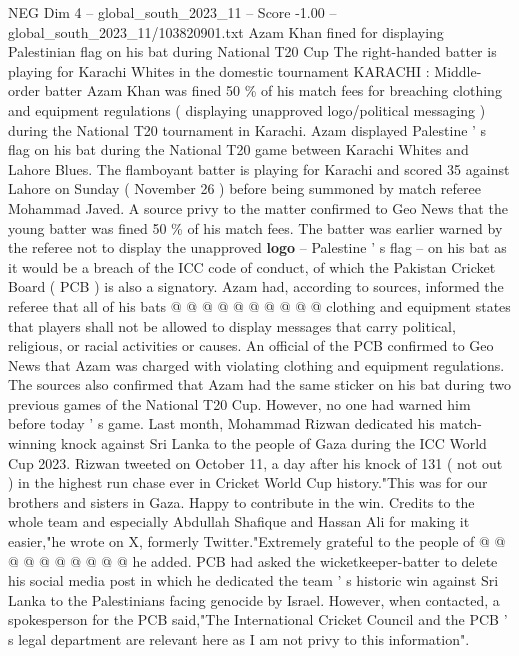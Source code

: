 \begin{textsample}{NEG Dim 4 – global\_south\_2023\_11 – Score -1.00 – global\_south\_2023\_11/103820901.txt}  \label{ex:f4_neg_301}
Azam Khan fined for displaying Palestinian flag on his bat during National T20 Cup The right-handed batter is playing for Karachi Whites in the domestic tournament KARACHI : Middle-order batter Azam Khan was fined 50 \% of his match fees for breaching clothing and equipment regulations ( displaying unapproved logo/political messaging ) during the National T20 tournament in Karachi.
Azam displayed Palestine ' s flag on his bat during the National T20 game between Karachi Whites and Lahore Blues.
The flamboyant batter is playing for Karachi and scored 35 against Lahore on Sunday ( November 26 ) before being summoned by match referee Mohammad Javed.
A source privy to the matter confirmed to Geo News that the young batter was fined 50 \% of his match fees.
The batter was earlier warned by the referee not to display the unapproved \textbf{logo} -- Palestine ' s flag -- on his bat as it would be a breach of the ICC code of conduct, of which the Pakistan Cricket Board ( PCB ) is also a signatory.
Azam had, according to sources, informed the referee that all of his bats @ @ @ @ @ @ @ @ @ @ clothing and equipment states that players shall not be allowed to display messages that carry political, religious, or racial activities or causes.
An official of the PCB confirmed to Geo News that Azam was charged with violating clothing and equipment regulations.
The sources also confirmed that Azam had the same sticker on his bat during two previous games of the National T20 Cup.
However, no one had warned him before today ' s game.
Last month, Mohammad Rizwan dedicated his match-winning knock against Sri Lanka to the people of Gaza during the ICC World Cup 2023.
Rizwan tweeted on October 11, a day after his knock of 131 ( not out ) in the highest run chase ever in Cricket World Cup history."This was for our brothers and sisters in Gaza.
Happy to contribute in the win.
Credits to the whole team and especially Abdullah Shafique and Hassan Ali for making it easier,"he wrote on X, formerly Twitter."Extremely grateful to the people of @ @ @ @ @ @ @ @ @ @ he added.
PCB had asked the wicketkeeper-batter to delete his social media post in which he dedicated the team ' s historic win against Sri Lanka to the Palestinians facing genocide by Israel.
However, when contacted, a spokesperson for the PCB said,"The International Cricket Council and the PCB ' s legal department are relevant here as I am not privy to this information".

\end{textsample}

